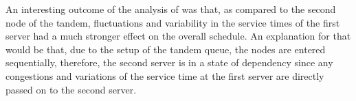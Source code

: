 \documentclass[11pt,a4paper]{article}
\begin{document}
\begin{spacing}{1.8}
 An interesting outcome of the analysis of \citet{Kuiper2015} was that, as compared to the second node of the tandem, fluctuations and  variability in the service times of the first server had a  much stronger effect on the overall schedule. An explanation for that would be that, due to the setup of the tandem queue, the nodes are entered sequentially, therefore, the second server is in a state of dependency 
since any congestions and variations of the service time at the first server are directly passed on to the second server.


\end{spacing}
\end{document}
